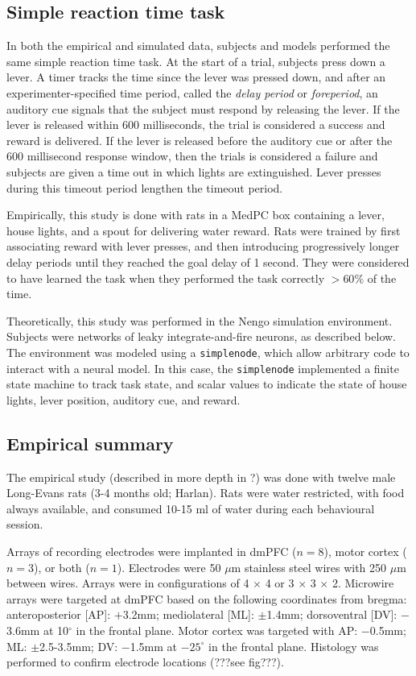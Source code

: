 \documentclass[12pt]{article}
\begin{document}
\subsection{Simple reaction time task}

In both the empirical and simulated data,
subjects and models performed the same simple reaction time task.
At the start of a trial,
subjects press down a lever.
A timer tracks the time since the lever was pressed down,
and after an experimenter-specified time period,
called the \textit{delay period} or \textit{foreperiod},
an auditory cue signals that the subject must respond
by releasing the lever.
If the lever is released within 600 milliseconds,
the trial is considered a success
and reward is delivered.
If the lever is released before the auditory cue
or after the 600 millisecond response window,
then the trials is considered a failure
and subjects are given a time out in which
lights are extinguished.
Lever presses during this timeout period
lengthen the timeout period.

Empirically, this study is done with rats
in a MedPC box containing a lever,
house lights, and a spout for delivering water reward.
Rats were trained by first
associating reward with lever presses,
and then introducing progressively longer
delay periods until they reached the goal delay
of 1 second.
They were considered to have learned the task
when they performed the task correctly $>60\%$
of the time.

Theoretically, this study was performed
in the Nengo simulation environment.
Subjects were networks of leaky integrate-and-fire
neurons, as described below.
The environment was modeled using a
\texttt{simplenode}, which allow arbitrary code
to interact with a neural model.
In this case, the \texttt{simplenode} implemented
a finite state machine to track task state,
and scalar values to indicate the state of
house lights, lever position, auditory cue, and reward.

\subsection{Empirical summary}

The empirical study (described in more depth in ?) %
was done with twelve male Long-Evans rats (3-4 months old; Harlan).
Rats were water restricted, with food always available,
and consumed 10-15 ml of water during each
behavioural session.

Arrays of recording electrodes were implanted
in dmPFC ($n = 8$), motor cortex ($n = 3$), or both ($n = 1$).
Electrodes were 50 $\mu$m stainless steel wires
with 250 $\mu$m between wires.
Arrays were in configurations of
4 $\times$ 4 or 3 $\times$ 3 $\times$ 2.
Microwire arrays were targeted at dmPFC
based on the following coordinates from bregma:
anteroposterior [AP]: $+$3.2mm;
mediolateral [ML]: $\pm$1.4mm;
dorsoventral [DV]: $-$3.6mm at 10$^\circ$ in the frontal plane.
Motor cortex was targeted with
AP: $-$0.5mm; ML: $\pm$2.5-3.5mm;
DV: $-$1.5mm at $-25^\circ$ in the frontal plane.
Histology was performed to confirm electrode locations
(???see fig???).
\end{document}
